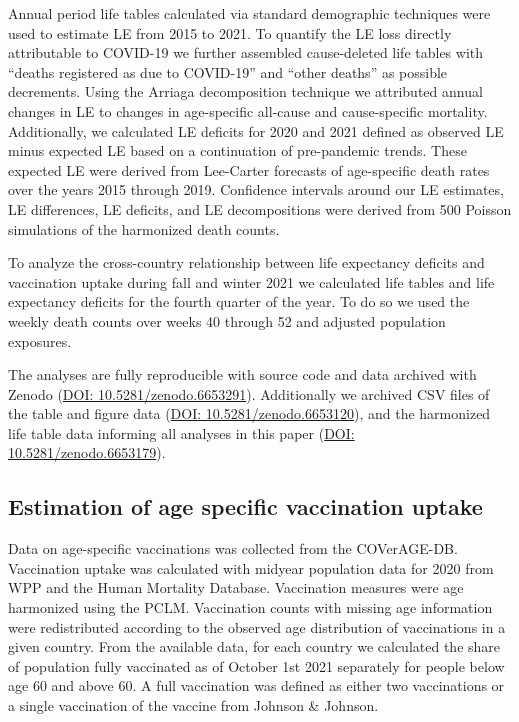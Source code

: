 \documentclass[12pt]{article}
\begin{document}
Annual period life tables calculated via standard demographic techniques\citealp{Chiang1979} were used to estimate LE from 2015 to 2021. To quantify the LE loss directly attributable to COVID-19 we further assembled cause-deleted life tables with ``deaths registered as due to COVID-19'' and ``other deaths'' as possible decrements.\citealp{Preston2001} Using the Arriaga decomposition technique\citealp{Arriaga1984} we attributed annual changes in LE to changes in age-specific all-cause and cause-specific mortality. Additionally, we calculated LE deficits for 2020 and 2021 defined as observed LE minus expected LE based on a continuation of pre-pandemic trends. These expected LE were derived from Lee-Carter forecasts\citealp{Lee1992} of age-specific death rates over the years 2015 through 2019. Confidence intervals around our LE estimates, LE differences, LE deficits, and LE decompositions were derived from 500 Poisson simulations of the harmonized death counts.

To analyze the cross-country relationship between life expectancy deficits and vaccination uptake during fall and winter 2021 we calculated life tables and life expectancy deficits for the fourth quarter of the year. To do so we used the weekly death counts over weeks 40 through 52 and adjusted population exposures.

The analyses are fully reproducible with source code and data archived with Zenodo (\href{https://zenodo.org/record/6653291}{DOI:  10.5281/zenodo.6653291}). Additionally we archived CSV files of the table and figure data (\href{https://zenodo.org/record/6653120}{DOI: 10.5281/zenodo.6653120}), and the harmonized life table data informing all analyses in this paper (\href{https://zenodo.org/record/6653179}{DOI: 10.5281/zenodo.6653179}).

\subsection*{Estimation of age specific vaccination uptake}

Data on age-specific vaccinations was collected from the COVerAGE-DB.\citealp{Riffe2021} Vaccination uptake was calculated with midyear population data for 2020 from WPP\citealp{UnitedNations2021} and the Human Mortality Database. Vaccination measures were age harmonized using the PCLM. Vaccination counts with missing age information were redistributed according to the observed age distribution of vaccinations in a given country. From the available data, for each country we calculated the share of population fully vaccinated as of October 1st 2021 separately for people below age 60 and above 60. A full vaccination was defined as either two vaccinations or a single vaccination of the vaccine from Johnson \& Johnson.
\end{document}
